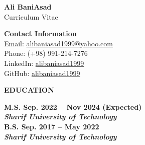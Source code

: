 \documentclass[12pt]{article}
\begin{document}

\begin{center}
	{\Large \bfseries Ali BaniAsad} \\ 
	{\large Curriculum Vitae} 	
\end{center}

	{\noindent \bf Contact Information} \\ 
	\href{mailto:alibaniasad1999@yahoo.com}{\faEnvelope} Email: \href{mailto:alibaniasad1999@yahoo.com}{alibaniasad1999@yahoo.com}   \\ 
	\faPhone \hspace{0pt}
	Phone: (+98) 991-214-7276  \\ 
	\href{https://linkedin.com/in/alibaniasad1999/}{\textcolor{blue}{\faLinkedin}}
	LinkedIn: \href{https://linkedin.com/in/alibaniasad1999/}{alibaniasad1999} \\
	\href{https://github.com/alibaniasad1999}{\faGithub}
	GitHub: \href{https://github.com/alibaniasad1999}{alibaniasad1999}


\begin{center} %
	{\noindent \bfseries EDUCATION}
\end{center} %

\vspace{8pt} %

\noindent
 \bf{M.S.}
  \hfill Sep. 2022 -- Nov 2024 (Expected) \\ 
\noindent \textit{Sharif University of Technology} \\

\noindent
 \bf{B.S.}
 \hfill Sep. 2017 -- May 2022 \\ 
\noindent \textit{Sharif University of Technology} \\
 

\end{document}
